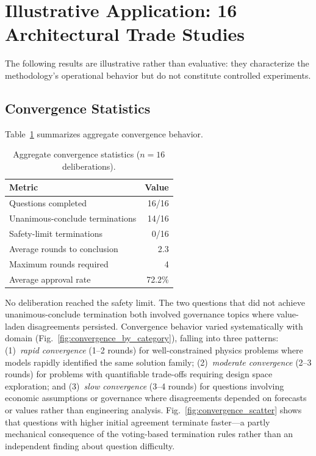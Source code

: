 \documentclass[11pt,a4paper]{article}
\begin{document}
\section{Illustrative Application: 16 Architectural Trade Studies}
\label{sec:results}

The following results are illustrative rather than evaluative: they characterize the methodology's operational behavior but do not constitute controlled experiments.

\subsection{Convergence Statistics}

Table~\ref{tab:convergence} summarizes aggregate convergence behavior.

\begin{table}[ht]
\centering
\caption{Aggregate convergence statistics ($n = 16$ deliberations).}
\label{tab:convergence}
\begin{tabular}{@{}lr@{}}
\toprule
\textbf{Metric} & \textbf{Value} \\
\midrule
Questions completed & 16/16 \\
Unanimous-conclude terminations & 14/16 \\
Safety-limit terminations & 0/16 \\
Average rounds to conclusion & 2.3 \\
Maximum rounds required & 4 \\
Average approval rate & 72.2\% \\
\bottomrule
\end{tabular}
\end{table}

No deliberation reached the safety limit. The two questions that did not achieve unanimous-conclude termination both involved governance topics where value-laden disagreements persisted. Convergence behavior varied systematically with domain (Fig.~\ref{fig:convergence_by_category}), falling into three patterns: (1)~\emph{rapid convergence} (1--2 rounds) for well-constrained physics problems where models rapidly identified the same solution family; (2)~\emph{moderate convergence} (2--3 rounds) for problems with quantifiable trade-offs requiring design space exploration; and (3)~\emph{slow convergence} (3--4 rounds) for questions involving economic assumptions or governance where disagreements depended on forecasts or values rather than engineering analysis. Fig.~\ref{fig:convergence_scatter} shows that questions with higher initial agreement terminate faster---a partly mechanical consequence of the voting-based termination rules rather than an independent finding about question difficulty.
\end{document}
